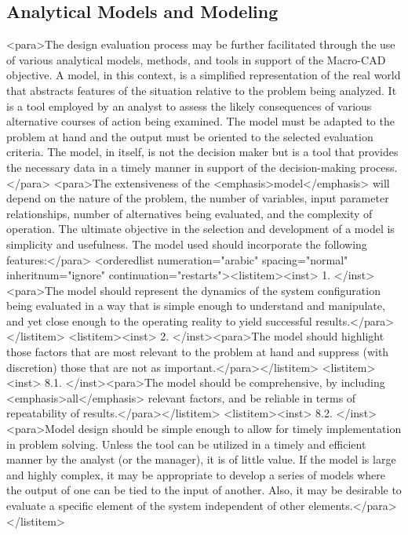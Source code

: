 \subsection{Analytical Models and Modeling}

<para>The design evaluation process may be further facilitated through the use of various analytical models, methods, and tools in support of the Macro-CAD objective. A model, in this context, is a simplified representation of the real world that abstracts features of the situation relative to the problem being analyzed. It is a tool employed by an analyst to assess the likely consequences of various alternative courses of action being examined. The model must be adapted to the problem at hand and the output must be oriented to the selected evaluation criteria. The model, in itself, is not the decision maker but is a tool that provides the necessary data in a timely manner in support of the decision-making process.</para>
<para>The extensiveness of the <emphasis>model</emphasis> will depend on the nature of the problem, the number of variables, input parameter relationships, number of alternatives being evaluated, and the complexity of operation. The ultimate objective in the selection and development of a model is simplicity and usefulness. The model used should incorporate the following features:</para>
<orderedlist numeration="arabic" spacing="normal" inheritnum="ignore" continuation="restarts"><listitem><inst>	1.	</inst><para>The model should represent the dynamics of the system configuration being evaluated in a way that is simple enough to understand and manipulate, and yet close enough to the operating reality to yield successful results.</para></listitem>
<listitem><inst>	2.	</inst><para>The model should highlight those factors that are most relevant to the problem at hand and suppress (with discretion) those that are not as important.</para></listitem>
<listitem><inst>	8.1.	</inst><para>The model should be comprehensive, by including <emphasis>all</emphasis> relevant factors, and be reliable in terms of repeatability of results.</para></listitem>
<listitem><inst>	8.2.	</inst><para>Model design should be simple enough to allow for timely implementation in problem solving. Unless the tool can be utilized in a timely and efficient manner by the analyst (or the manager), it is of little value. If the model is large and highly complex, it may be appropriate to develop a series of models where the output of one can be tied to the input of another. Also, it may be desirable to evaluate a specific element of the system independent of other elements.</para></listitem>

